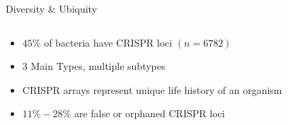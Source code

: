 \documentclass[dvipsnames]{beamer}
\begin{document}
\begin{frame}[fragile]{Diversity \& Ubiquity}
    \begin{columns}
    \begin{column}{0.5\textwidth}
        \begin{itemize}
            \item<2-> $45\%$ of bacteria have CRISPR loci $(n=6782)$\autocite{crispdb}
            \item<3-> 3 Main Types, multiple subtypes\autocite{acqorres}
            \item<4-> CRISPR arrays represent unique life history of an organism
            \item<5-> $11\%-28\%$ are false or orphaned CRISPR loci\autocite{ineqcas}
        \end{itemize}
    \end{column}
    \begin{column}{0.5\textwidth}
    \begin{figure}[htb!]
        \autocite{evocas}
    \end{figure}
    \end{column}
    \end{columns}
\end{frame}
\end{document}
